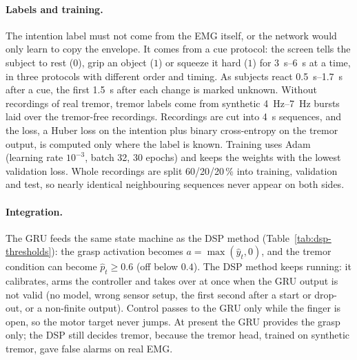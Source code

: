 \paragraph{Labels and training.}
The intention label must not come from the EMG itself, or the network would only learn to
copy the envelope. It comes from a cue protocol: the screen tells the subject to rest
($0$), grip an object ($1$) or squeeze it hard ($1$) for \SIrange{3}{6}{s} at a time, in
three protocols with different order and timing. As subjects react \SIrange{0.5}{1.7}{s}
after a cue, the first \SI{1.5}{s} after each change is marked unknown. Without recordings
of real tremor, tremor labels come from synthetic \SIrange{4}{7}{Hz} bursts laid over the
tremor-free recordings. Recordings are cut into \SI{4}{s} sequences, and the loss, a Huber
loss on the intention plus binary cross-entropy on the tremor output, is computed only
where the label is known. Training uses Adam~\cite{kingma2015adam} (learning rate
$10^{-3}$, batch 32, 30 epochs) and keeps the weights with the lowest validation loss.
Whole recordings are split 60/20/20\,\% into training, validation and test, so nearly
identical neighbouring sequences never appear on both sides.

\paragraph{Integration.}
The GRU feeds the same state machine as the DSP method (Table~\ref{tab:dsp-thresholds}):
the grasp activation becomes $a = \max(\hat y_t, 0)$, and the tremor condition can become
$\hat p_t \geq 0.6$ (off below $0.4$). The DSP method keeps running: it calibrates, arms
the controller and takes over at once when the GRU output is not valid (no model, wrong
sensor setup, the first second after a start or drop-out, or a non-finite output).
Control passes to the GRU only while the finger is open, so the motor target never jumps.
At present the GRU provides the grasp only; the DSP still decides tremor, because the
tremor head, trained on synthetic tremor, gave false alarms on real EMG.
